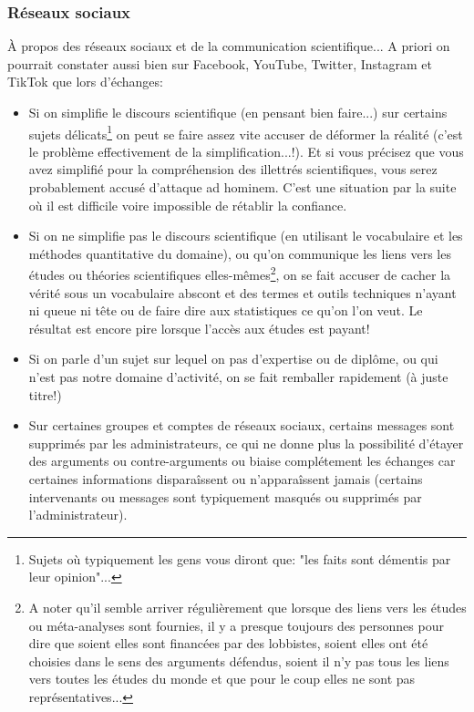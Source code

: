 	\subsubsection{R\'eseaux sociaux}		
	À propos des r\'eseaux sociaux et de la communication scientifique... A priori on pourrait constater aussi bien sur Facebook, YouTube, Twitter, Instagram et TikTok que lors d'\'echanges:
	\begin{itemize}
		\item Si on simplifie le discours scientifique (en pensant bien faire...) sur certains sujets d\'elicats\footnote{Sujets où typiquement les gens vous diront que: "les faits sont d\'ementis par leur opinion"...} on peut se faire assez vite accuser de d\'eformer la r\'ealit\'e (c'est le problème effectivement de la simplification...!). Et si vous pr\'ecisez que vous avez simplifi\'e pour la compr\'ehension des illettr\'es scientifiques, vous serez probablement accus\'e d’attaque ad hominem. C'est une situation par la suite où il est difficile voire impossible de r\'etablir la confiance.
	
		\item Si on ne simplifie pas le discours scientifique (en utilisant le vocabulaire et les m\'ethodes quantitative du domaine), ou qu'on communique les liens vers les \'etudes ou th\'eories scientifiques elles-mêmes\footnote{A noter qu'il semble arriver r\'egulièrement que lorsque des liens vers les \'etudes ou m\'eta-analyses sont fournies, il y a presque toujours des personnes pour dire que soient elles sont financ\'ees par des lobbistes, soient elles ont \'et\'e choisies dans le sens des arguments d\'efendus, soient il n'y pas tous les liens vers toutes les \'etudes du monde et que pour le coup elles ne sont pas repr\'esentatives...}, on se fait accuser de cacher la v\'erit\'e sous un vocabulaire abscont et des termes et outils techniques n'ayant ni queue ni tête ou de faire dire aux statistiques ce qu'on l'on veut. Le r\'esultat est encore pire lorsque l'accès aux \'etudes est payant!
	
		\item Si on parle d'un sujet sur lequel on pas d'expertise ou de diplôme, ou qui n'est pas notre domaine d'activit\'e, on se fait remballer rapidement (à juste titre!)
	
		\item Sur certaines groupes et comptes de r\'eseaux sociaux, certains messages sont supprim\'es par les administrateurs, ce qui ne donne plus la possibilit\'e d'\'etayer des arguments ou contre-arguments ou biaise compl\'etement les \'echanges car certaines informations disparaîssent  ou n'apparaîssent jamais (certains intervenants ou messages sont typiquement masqu\'es ou supprim\'es par l'administrateur).
		

\end{itemize}
